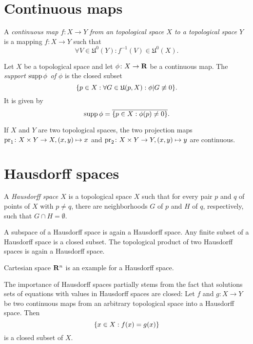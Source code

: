 \section{Continuous maps}
\label{sec:continuity}

\begin{dfn}
  A \emph{continuous map $f\colon X \to Y$ from an topological space $X$ to
  a topological space $Y$} is a mapping $f\colon X \to Y$ such that
  \[
    \forall V \in \mathfrak U^0(Y) : f^{-1}(V) \in \mathfrak U^0(X).
  \]
\end{dfn}

Let $X$ be a topological space and let $\phi\colon X \to \mathbf{R}$ be a continuous map.
The \emph{support $\operatorname{supp} \phi$ of $\phi$} is the closed subset
\[
  \lbrace p \in X : \forall G \in \mathfrak U(p, X): \phi|G \not\equiv 0\rbrace.
\]
It is given by
\begin{equation}
  \label{eq:support}
  \operatorname{supp} \phi = \overline{\lbrace p \in X : \phi(p) \neq 0\rbrace}.
\end{equation}

If $X$ and $Y$ are two topological spaces, the two projection maps
$\mathrm{pr}_1\colon X \times Y \to X, (x, y) \mapsto x$ and
$\mathrm{pr}_2\colon X \times Y \to Y, (x, y) \mapsto y$ are continuous.

\section{Hausdorff spaces}
\label{sec:hausdorff_spaces}

\begin{dfn}
  A \emph{Hausdorff space $X$} is a topological space $X$ such that for every
  pair $p$ and $q$ of points of $X$ with $p \neq q$, there are neighborhoods $G$
  of $p$ and $H$ of $q$, respectively, such that $G \cap H = \emptyset$.
\end{dfn}
A subspace of a Hausdorff space is again a Hausdorff space. Any finite subset of
a Hausdorff space is a closed subset. The topological product of two Hausdorff
spaces is again a Hausdorff space.

Cartesian space $\mathbf{R}^n$ is an example for a Hausdorff space.

The importance of Hausdorff spaces partially stems from the fact that
solutions sets of equations with values in Hausdorff spaces are closed: Let
$f$ and $g\colon X \to Y$ be two continuous maps from an arbitrary topological
space into a Hausdorff space. Then
\[
  \lbrace x \in X: f(x) = g(x)\rbrace
\]
is a closed subset of $X$.

